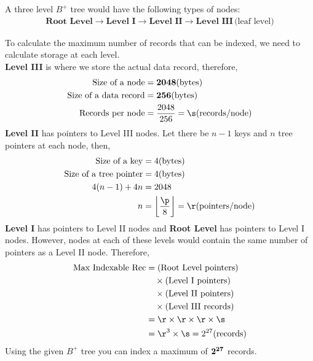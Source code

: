 \begin{solution}[\fullpage]
  
  A three level $B^{+}$ tree would have the following types
  of nodes:
  \begin{align}
    \textbf{Root Level}\rightarrow\textbf{Level I}
      \rightarrow\textbf{Level II}
      \rightarrow\textbf{Level III}\,\text{(leaf level)} \nonumber
  \end{align}
  
  To calculate the maximum number of records that can be
  indexed, we need to calculate storage at each level.\\
  \textbf{Level III} is where we store the actual data record,
  therefore,
  \begin{align}
    \text{Size of a node}        &= \mathbf{\va}\text{(bytes)} \\
    \text{Size of a data record} &= \mathbf{\vb}\text{(bytes)} \\
    \text{Records per node}      &= \dfrac{\va}{\vb} = \s\text{(records/node)}
  \end{align}
  \textbf{Level II} has pointers to Level III nodes. Let there 
  be $n-1$ keys and $n$ tree pointers at each node, then,
  \begin{align}
    \text{Size of a key}          &= 4\text{(bytes)} \\
    \text{Size of a tree pointer} &= 4\text{(bytes)} \\
    4(n-1) + 4n                   &= \va \\
                                n &= \left\lfloor{\dfrac{\p}{8}}\right\rfloor 
                                   = \r\text{(pointers/node)}
  \end{align}
  \textbf{Level I} has pointers to Level II nodes and \textbf{Root Level}
  has pointers to Level I nodes. However, nodes at each of these levels 
  would contain the same number of pointers as a Level II node. Therefore,
  \begin{align}
    \text{Max Indexable Rec} &= \text{(Root Level pointers)} \nonumber \\
                             &\quad\times\text{(Level I pointers)} \nonumber \\
                             &\quad\times\text{(Level II pointers)} \nonumber \\
                             &\quad\times\text{(Level III records)} \\
                             &= \r\times \r\times \r\times \s \\
                             &= \r^{3}\times \s = 2^{\vc} \text{(records)}
  \end{align}
  Using the given $B^{+}$ tree you can index a maximum of $\mathbf{2^{27}}$ records.
\end{solution}

